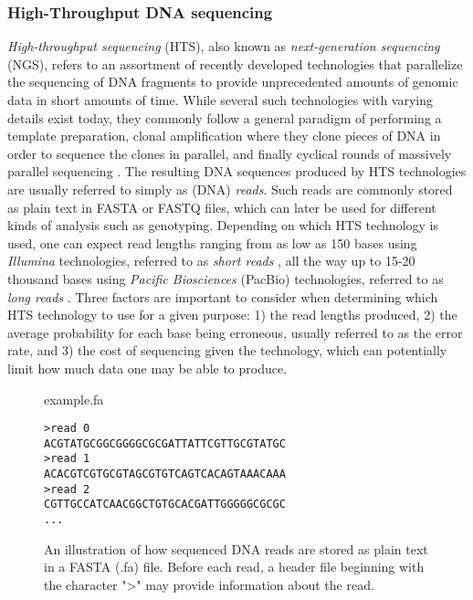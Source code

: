 \subsubsection{High-Throughput DNA sequencing} \label{background:biology:high_throughput_dna_sequencing}
\textit{High-throughput sequencing} (HTS), also known as \textit{next-generation sequencing} (NGS), refers to an assortment of recently developed technologies that parallelize the sequencing of DNA fragments to provide unprecedented amounts of genomic data in short amounts of time.
While several such technologies with varying details exist today, they commonly follow a general paradigm of performing a template preparation, clonal amplification where they clone pieces of DNA in order to sequence the clones in parallel, and finally cyclical rounds of massively parallel sequencing \cite{hts}.
The resulting DNA sequences produced by HTS technologies are usually referred to simply as (DNA) \textit{reads}.
Such reads are commonly stored as plain text in FASTA or FASTQ files, which can later be used for different kinds of analysis such as genotyping.
Depending on which HTS technology is used, one can expect read lengths ranging from as low as 150 bases using \textit{Illumina} technologies, referred to as \textit{short reads} \cite{illumina_read_length}, all the way up to 15-20 thousand bases using \textit{Pacific Biosciences} (PacBio) technologies, referred to as \textit{long reads} \cite{hts2}.
Three factors are important to consider when determining which HTS technology to use for a given purpose: 1) the read lengths produced, 2) the average probability for each base being erroneous, usually referred to as the error rate, and 3) the cost of sequencing given the technology, which can potentially limit how much data one may be able to produce.

\begin{figure}[H]
\begin{center}
\small{example.fa}
\end{center}
\begin{lstlisting}[style=vcf]
>read 0
ACGTATGCGGCGGGGCGCGATTATTCGTTGCGTATGC
>read 1
ACACGTCGTGCGTAGCGTGTCAGTCACAGTAAACAAA
>read 2
CGTTGCCATCAACGGCTGTGCACGATTGGGGGCGCGC
...
\end{lstlisting}
\caption{
  An illustration of how sequenced DNA reads are stored as plain text in a FASTA (.fa) file.
  Before each read, a header file beginning with the character ">" may provide information about the read.
}
\label{background:biology:high_throughput_dna_sequencing:figures:fasta}
\end{figure}

